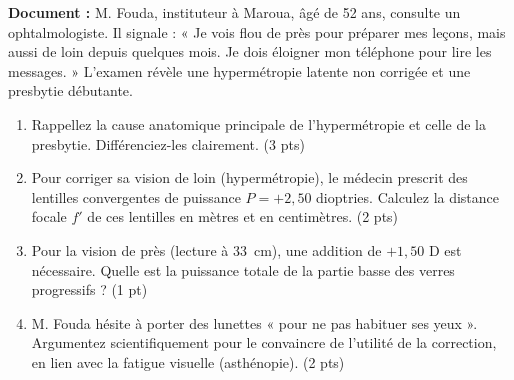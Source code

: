 \documentclass[11pt]{article}
\begin{document}
\begin{exercice}
    \textbf{Document :} M. Fouda, instituteur à Maroua, âgé de 52 ans, consulte un ophtalmologiste. Il signale : « Je vois flou de près pour préparer mes leçons, mais aussi de loin depuis quelques mois. Je dois éloigner mon téléphone pour lire les messages. » L'examen révèle une hypermétropie latente non corrigée et une presbytie débutante.
    \begin{enumerate}
        \item Rappellez la cause anatomique principale de l'hypermétropie et celle de la presbytie. Différenciez-les clairement. (3 pts)
        \item Pour corriger sa vision de loin (hypermétropie), le médecin prescrit des lentilles convergentes de puissance $P = +2,50$ dioptries. Calculez la distance focale $f'$ de ces lentilles en mètres et en centimètres. (2 pts)
        \item Pour la vision de près (lecture à \SI{33}{cm}), une addition de $+1,50$ D est nécessaire. Quelle est la puissance totale de la partie basse des verres progressifs ? (1 pt)
        \item M. Fouda hésite à porter des lunettes « pour ne pas habituer ses yeux ». Argumentez scientifiquement pour le convaincre de l'utilité de la correction, en lien avec la fatigue visuelle (asthénopie). (2 pts)
    \end{enumerate}
\end{exercice}
\end{document}
